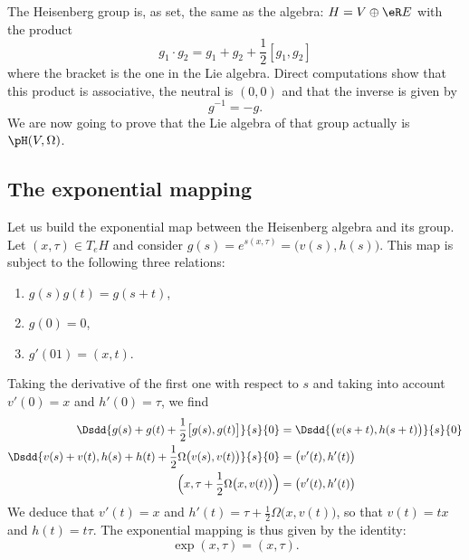 The Heisenberg group is, as set, the same as the algebra: $H=V\oplus\eR E$ with the product
\begin{equation}		\label{EqProduitHeisenbergGp}
	g_1\cdot g_2=g_1+g_2+\frac{ 1 }{2}[g_1,g_2]
\end{equation}
where the bracket is the one in the Lie algebra. Direct computations show that this product is associative, the neutral is $(0,0)$ and that the inverse is given by
\begin{equation}
	g^{-1}=-g.
\end{equation}
We are now going to prove that the Lie algebra of that group actually is $\pH(V,\Omega)$.

\subsection{The exponential mapping}

Let us build the exponential map between the Heisenberg algebra and its group. Let $(x,\tau)\in T_eH$ and consider $g(s)= e^{s(x,\tau)}=\big( v(s),h(s) \big)$.  This map is subject to the following three relations:
\begin{enumerate}

	\item
	      $g(s)g(t)=g(s+t)$,
	\item
	      $g(0)=0$,
	\item
	      $g'(01)=(x,t)$.

\end{enumerate}
Taking the derivative of the first one with respect to $s$ and taking into account $v'(0)=x$ and $h'(0)=\tau$, we find
\begin{subequations}
	\begin{align}
		\Dsdd{g(s)+g(t)+\frac{ 1 }{2}\big[ g(s),g(t) \big]  }{s}{0}                 & =\Dsdd{ \big( v(s+t),h(s+t) \big) }{s}{0} \\
		\Dsdd{ v(s)+v(t),h(s)+h(t)+\frac{ 1 }{2}\Omega\big( v(s),v(t) \big) }{s}{0} & =\big( v'(t),h'(t) \big)                  \\
		\Big( x,\tau+\frac{ 1 }{2}\Omega\big( x,v(t) \big) \Big)                    & =\big( v'(t),h'(t) \big)
	\end{align}
\end{subequations}
We deduce that $v'(t)=x$ and $h'(t)=\tau+\frac{ 1 }{2}\Omega\big( x,v(t) \big)$, so that $v(t)=tx$ and $h(t)=t\tau$. The exponential mapping is thus given by the identity:
\begin{equation}
	\exp(x,\tau)=(x,\tau).
\end{equation}

